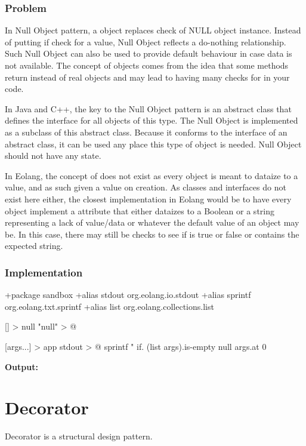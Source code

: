 \documentclass[12pt]{book}
\begin{document}
{{\subsubsection{Problem}
In Null Object pattern, a  object replaces check of NULL object instance. Instead of putting if check for a  value, Null Object reflects a do-nothing relationship. Such Null Object can also be used to provide default behaviour in case data is not available. The concept of  objects comes from the idea that some methods return  instead of real objects and may lead to having many checks for  in your code. 

In Java and C++, the key to the Null Object pattern is an abstract class that defines the interface for all objects of this type. The Null Object is implemented as a subclass of this abstract class. Because it conforms to the interface of an abstract class, it can be used any place this type of object is needed. Null Object should not have any state.

In Eolang, the concept of  does not exist as every object is meant to dataize to a value, and as such given a value on creation. As classes and interfaces do not exist here either, the closest implementation in Eolang would be to have every object implement a  attribute that either dataizes to a Boolean or a string representing a lack of value/data or whatever the default value of an object may be. In this case, there may still be checks to see if  is true or false or contains the expected string.

\subsubsection{Implementation}
\begin{ffcode}
+package sandbox
+alias stdout org.eolang.io.stdout
+alias sprintf org.eolang.txt.sprintf
+alias list org.eolang.collections.list

[] > null
  "null" > @

[args...] > app
  stdout > @
    sprintf
      "%
      if.
        (list args).is-empty
        null
        args.at 0 
\end{ffcode}
\textbf{Output:}

\section{Decorator}
Decorator is a structural design pattern.

}}
\end{document}
